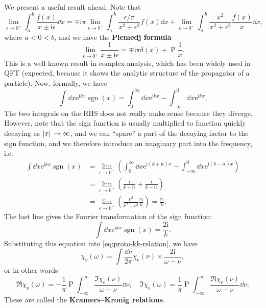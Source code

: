 \documentclass[hyperref, a4paper]{article}
\DeclareMathOperator{\primevalue}{P}
\DeclareMathOperator{\sgn}{sgn}
\newcommand*{\ii}{\mathrm{i}}
\newcommand*{\ee}{\mathrm{e}}
\newcommand*{\concept}[1]{{\textbf{#1}}}
\begin{document}
We present a useful result ahead. Note that 
\[
    \lim_{\epsilon \to 0^+} \int_a^b \frac{f(x)}{x \pm \ii \epsilon} \dd{x} = \mp \ii \pi \lim_{\epsilon \to 0^+} \int_a^b \frac{\epsilon / \pi}{x^2 + \epsilon^2} f(x) \dd{x} + \lim_{\epsilon \to 0^+} \int_a^b \frac{x^2}{x^2 + \epsilon^2} \frac{f(x)}{x} \dd{x} ,
\]
where $a < 0 < b$, and we have the \concept{Plemedj formula}
\begin{equation}
    \lim_{\epsilon \to 0^+} \frac{1}{x \pm \ii \epsilon} = \mp \ii \pi \delta(x) + \primevalue \frac{1}{x}.
    \label{eq:plemedj}
\end{equation}
This is a well known result in complex analysis, which has been widely used in QFT (expected, because it shows the analytic structure of the propagator of a particle).
Now, formally, we have 
\[
    \int \dd{x} \ee^{\ii k x} \sgn(x) = \int_0^\infty \dd{x} \ee^{\ii k x} - \int^0_{-\infty} \dd{x} \ee^{\ii k x} .
\]
The two integrals on the RHS does not really make sense because they diverge.
However, note that the sign function is usually multiplied to  function quickly decaying as $\abs*{x} \to \infty$, and we can ``spare'' a part of the decaying factor to the sign function, and we therefore introduce an imaginary part into the frequency, i.e.
\[
    \begin{aligned}
        \int \dd{x} \ee^{\ii k x} \sgn(x) &= \lim_{\epsilon \to 0^+} \left(\int_0^\infty \dd{x} \ee^{\ii (k + \ii \epsilon) x} - \int^0_{-\infty} \dd{x} \ee^{\ii (k - \ii \epsilon) x}\right) \\
        &= \lim_{\epsilon \to 0^+} \left( \frac{\ii}{k + \ii \epsilon} + \frac{\ii}{k - \ii \epsilon} \right) \\
        &= \lim_{\epsilon \to 0^+} \left( \frac{k^2}{k^2 + \epsilon^2} \frac{2 \ii }{k} \right) = \frac{2\ii}{k}. 
    \end{aligned}
\]
The last line gives the Fourier transformation of the sign function:
\begin{equation}
    \int \dd{x} \ee^{\ii k x} \sgn(x) = \frac{2\ii}{k}. 
\end{equation}
Substituting this equation into \eqref{eq:proto-kk-relation}, we have 
\begin{equation}
    \chi_\text{e}(\omega) = \int \frac{\dd{\nu}}{2\pi}\chi_\text{e}(\nu) \times \frac{2\ii}{\omega - \nu},
    \label{eq:k-k-complex}
\end{equation}
or in other words
\begin{equation}
    \Re \chi_\text{e}(\omega) = - \frac{1}{\pi} \primevalue \int_{-\infty}^\infty \frac{\Im \chi_\text{e}(\nu)}{\omega - \nu} \dd{\nu}, \quad \Im \chi_\text{e}(\omega) = \frac{1}{\pi} \primevalue \int_{-\infty}^\infty \frac{\Re \chi_\text{e}(\nu)}{\omega - \nu} \dd{\nu}.
    \label{eq:kk-relation}
\end{equation}
These are called the \concept{Kramers–Kronig relations}.
\end{document}
